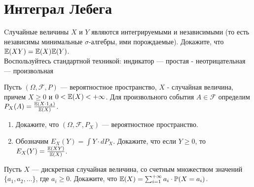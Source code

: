 \section{Интеграл Лебега}

\begin{problem}
Cлучайные величины $X$ и $Y$ являются интегрируемыми и независимыми
(то есть независимы минимальные $\sigma$-алгебры, ими
порождаемые). Докажите, что $\mathbb{E}(XY)=\mathbb{E}(X)\mathbb{E}(Y)$. \\
Воспользуйтесь стандартной техникой: индикатор — простая -
неотрицательная — произвольная

\begin{sol}

\end{sol}
\end{problem}

\begin{problem}
Пусть $(\Omega,\mathcal{F},P)$ — вероятностное пространство, $X$ -
случайная величина, причем $X\ge 0$ и $0<\mathbb{E}(X)< + \infty$. Для
произвольного события $A\in\mathcal{F}$ определим
$P_{X}(A)=\frac{\mathbb{E}(X\cdot 1_{A})}{\mathbb{E}(X)}$.
\begin{enumerate}
\item Докажите, что $(\Omega,\mathcal{F},P_{X})$ — вероятностное пространство.
\item Обозначим $E_{X}(Y)=\int Y \cdot dP_{X}$. Докажите, что
если $Y\ge 0$, то $E_{X}(Y)=\frac{\mathbb{E}(XY)}{\mathbb{E}(X)}$.
\end{enumerate}

\begin{sol}

\end{sol}
\end{problem}

\begin{problem}
Пусть $X$ — дискретная случайная величина, со счетным множеством
значений $\{a_{1},a_{2},\ldots\}$, где $a_{i} \ge 0$. Докажите, что
$\mathbb{E}(X)=\sum_{i=1}^{+\infty} a_{i}\cdot \mathbb{P}(X=a_{i})$.

\begin{sol}

\end{sol}
\end{problem}

